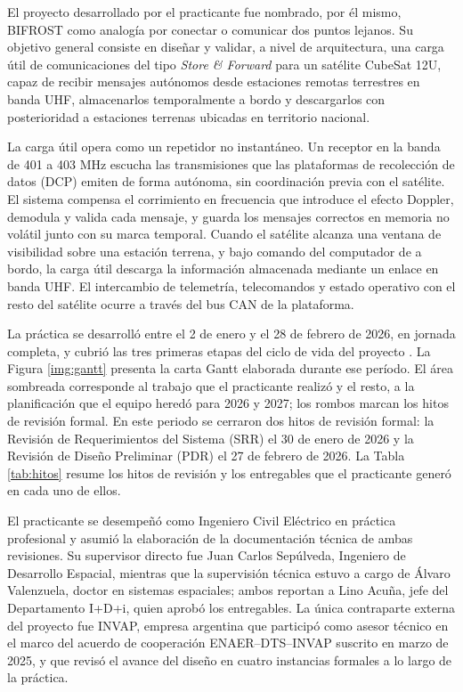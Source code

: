 El proyecto desarrollado por el practicante fue nombrado, por él mismo, BIFROST como analogía por conectar o comunicar dos puntos lejanos. Su objetivo general consiste en diseñar y validar, a nivel de arquitectura, una carga útil de comunicaciones del tipo \textit{Store \& Forward} para un satélite CubeSat 12U, capaz de recibir mensajes autónomos desde estaciones remotas terrestres en banda UHF, almacenarlos temporalmente a bordo y descargarlos con posterioridad a estaciones terrenas ubicadas en territorio nacional.

La carga útil opera como un repetidor no instantáneo. Un receptor en la banda de 401 a 403 MHz escucha las transmisiones que las plataformas de recolección de datos (DCP) emiten de forma autónoma, sin coordinación previa con el satélite. El sistema compensa el corrimiento en frecuencia que introduce el efecto Doppler, demodula y valida cada mensaje, y guarda los mensajes correctos en memoria no volátil junto con su marca temporal. Cuando el satélite alcanza una ventana de visibilidad sobre una estación terrena, y bajo comando del computador de a bordo, la carga útil descarga la información almacenada mediante un enlace en banda UHF. El intercambio de telemetría, telecomandos y estado operativo con el resto del satélite ocurre a través del bus CAN de la plataforma.

La práctica se desarrolló entre el 2 de enero y el 28 de febrero de 2026, en jornada completa, y cubrió las tres primeras etapas del ciclo de vida del proyecto \parencite{nasaseh}. La Figura \ref{img:gantt} presenta la carta Gantt elaborada durante ese período. El área sombreada corresponde al trabajo que el practicante realizó y el resto, a la planificación que el equipo heredó para 2026 y 2027; los rombos marcan los hitos de revisión formal. En este periodo se cerraron dos hitos de revisión formal: la Revisión de Requerimientos del Sistema (SRR) el 30 de enero de 2026 y la Revisión de Diseño Preliminar (PDR) el 27 de febrero de 2026. La Tabla \ref{tab:hitos} resume los hitos de revisión y los entregables que el practicante generó en cada uno de ellos.

El practicante se desempeñó como Ingeniero Civil Eléctrico en práctica profesional y asumió la elaboración de la documentación técnica de ambas revisiones. Su supervisor directo fue Juan Carlos Sepúlveda, Ingeniero de Desarrollo Espacial, mientras que la supervisión técnica estuvo a cargo de Álvaro Valenzuela, doctor en sistemas espaciales; ambos reportan a Lino Acuña, jefe del Departamento I+D+i, quien aprobó los entregables. La única contraparte externa del proyecto fue INVAP, empresa argentina que participó como asesor técnico en el marco del acuerdo de cooperación ENAER--DTS--INVAP suscrito en marzo de 2025, y que revisó el avance del diseño en cuatro instancias formales a lo largo de la práctica.

